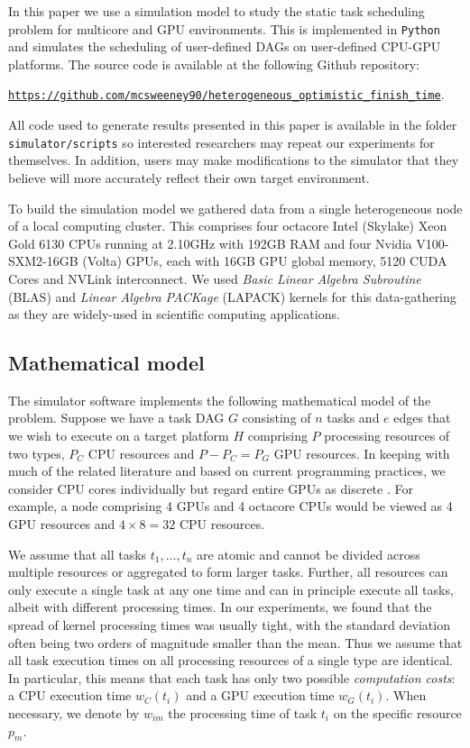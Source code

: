 \documentclass[runningheads]{llncs}
\begin{document}
In this paper we use a simulation model to study the static task scheduling problem for multicore and GPU environments. This is implemented in {\tt Python} and simulates the scheduling of user-defined DAGs on user-defined CPU-GPU platforms. The source code is available at the following Github repository: 
\begin{center}
	\href{https://github.com/mcsweeney90/heterogeneous_optimistic_finish_time}{{\tt \small https://github.com/mcsweeney90/heterogeneous\_optimistic\_finish\_time}}.
\end{center} 
All code used to generate results presented in this paper is available in the folder {\tt simulator/scripts} so interested researchers may repeat our experiments for themselves. In addition, users may make modifications to the simulator that they believe will more accurately reflect their own target environment. 

To build the simulation model we gathered data from a single heterogeneous node of a local computing cluster. This comprises four octacore Intel (Skylake) Xeon Gold 6130 CPUs running at 2.10GHz with 192GB RAM and four Nvidia V100-SXM2-16GB (Volta) GPUs, each with 16GB GPU global memory, 5120 CUDA Cores and NVLink interconnect. We used {\em Basic Linear Algebra Subroutine} (BLAS) \cite{Dongarra:1990:SLB:77626.79170} and {\em Linear Algebra PACKage} (LAPACK) \cite{laug} kernels for this data-gathering as they are widely-used in scientific computing applications.

\subsection{Mathematical model}
\label{subsect.mathematical_model}

The simulator software implements the following mathematical model of the problem. Suppose we have a task DAG $G$ consisting of $n$ tasks and $e$ edges that we wish to execute on a target platform $H$ comprising $P$ processing resources of two types, $P_C$ CPU resources and $P - P_C = P_G$ GPU resources. In keeping with much of the related literature and based on current programming practices, we consider CPU cores individually but regard entire GPUs as discrete \cite{agullo2016}. For example, a node comprising 4 GPUs and 4 octacore CPUs would be viewed as 4 GPU resources and $4 \times 8 = 32$ CPU resources.   

We assume that all tasks $t_1, \dots, t_n$ are atomic and cannot be divided across multiple resources or aggregated to form larger tasks. Further, all resources can only execute a single task at any one time and can in principle execute all tasks, albeit with different processing times. In our experiments, we found that the spread of kernel processing times was usually tight, with the standard deviation often being two orders of magnitude smaller than the mean. Thus we assume that all task execution times on all processing resources of a single type are identical. In particular, this means that each task has only two possible {\em computation costs}: a CPU execution time $w_C(t_i)$ and a GPU execution time $w_G(t_i)$. When necessary, we denote by $w_{im}$ the processing time of task $t_i$ on the specific resource $p_m$.
\end{document}
